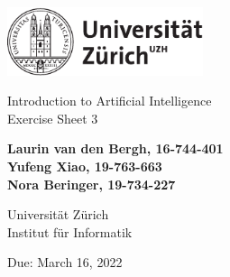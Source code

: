 \documentclass[12pt]{article}
\begin{document}
\begin{titlepage}
\includegraphics[height=20mm]{../images/uzh_logo}\\

\begin{flushleft}

\vspace{2cm}

{\Large Introduction to Artificial Intelligence\\Exercise Sheet 3}\\

\vspace{4cm}

\textbf{Laurin van den Bergh, 16-744-401\\Yufeng Xiao, 19-763-663\\Nora Beringer, 19-734-227}\\

\vspace{2cm}

Universität Zürich\\
Institut für Informatik

\vfill Due: March 16, 2022

\vspace{3cm}


\end{flushleft}
\end{titlepage}

\newpage
\end{document}
